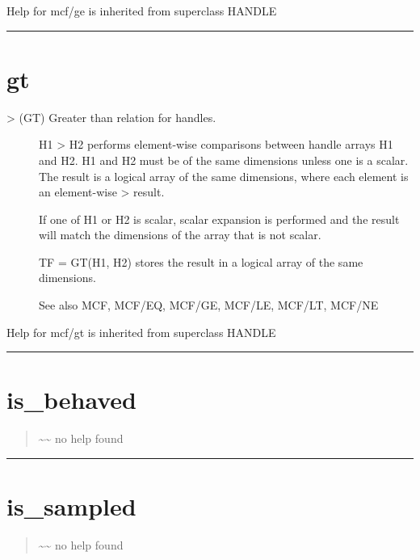 \documentclass[letterpaper,10pt,english]{sphinxmanual}
\begin{document}
Help for mcf/ge is inherited from superclass HANDLE


\bigskip\hrule{}\bigskip



\section{gt}
\label{classes/utils/@mcf/mcf:id13}\label{classes/utils/@mcf/mcf:gt}\begin{description}
\item[{\textgreater{} (GT)   Greater than relation for handles.}] \leavevmode
H1 \textgreater{} H2 performs element-wise comparisons between handle arrays H1 and
H2.  H1 and H2 must be of the same dimensions unless one is a scalar.
The result is a logical array of the same dimensions, where each
element is an element-wise \textgreater{} result.

If one of H1 or H2 is scalar, scalar expansion is performed and the
result will match the dimensions of the array that is not scalar.

TF = GT(H1, H2) stores the result in a logical array of the same
dimensions.

See also MCF, MCF/EQ, MCF/GE, MCF/LE, MCF/LT, MCF/NE

\end{description}

Help for mcf/gt is inherited from superclass HANDLE


\bigskip\hrule{}\bigskip



\section{is\_behaved}
\label{classes/utils/@mcf/mcf:id14}\label{classes/utils/@mcf/mcf:is-behaved}\begin{quote}

\textasciitilde{}\textasciitilde{} no help found
\end{quote}


\bigskip\hrule{}\bigskip



\section{is\_sampled}
\label{classes/utils/@mcf/mcf:is-sampled}\label{classes/utils/@mcf/mcf:id15}\begin{quote}

\textasciitilde{}\textasciitilde{} no help found
\end{quote}
\end{document}
